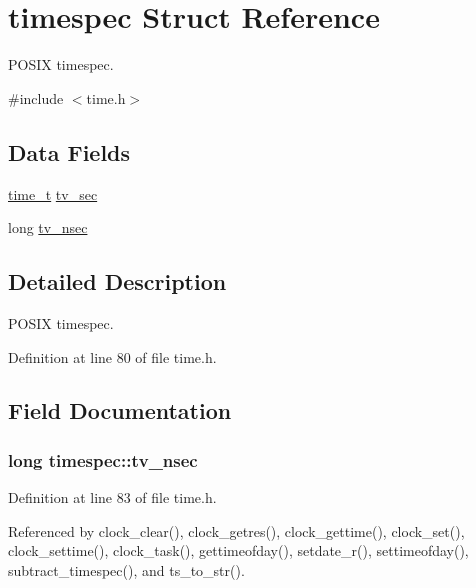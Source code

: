 \hypertarget{structtimespec}{\section{timespec Struct Reference}
\label{structtimespec}
}


P\-O\-S\-I\-X timespec.  




{\ttfamily \#include $<$time.\-h$>$}

\subsection*{Data Fields}
\begin{DoxyCompactItemize}
\item 
\hyperlink{time_8h_a3346b04b0420b32ccf6b706551b70762}{time\-\_\-t} \hyperlink{structtimespec_afc3302668d7cb5952f590da69fdd4955}{tv\-\_\-sec}
\item 
long \hyperlink{structtimespec_ae3c7510dafa8cbcaede866ed13c99683}{tv\-\_\-nsec}
\end{DoxyCompactItemize}


\subsection{Detailed Description}
P\-O\-S\-I\-X timespec. 

Definition at line 80 of file time.\-h.



\subsection{Field Documentation}
\hypertarget{structtimespec_ae3c7510dafa8cbcaede866ed13c99683}{
\subsubsection[{tv\-\_\-nsec}]{\setlength{\rightskip}{0pt plus 5cm}long timespec\-::tv\-\_\-nsec}}\label{structtimespec_ae3c7510dafa8cbcaede866ed13c99683}


Definition at line 83 of file time.\-h.



Referenced by clock\-\_\-clear(), clock\-\_\-getres(), clock\-\_\-gettime(), clock\-\_\-set(), clock\-\_\-settime(), clock\-\_\-task(), gettimeofday(), setdate\-\_\-r(), settimeofday(), subtract\-\_\-timespec(), and ts\-\_\-to\-\_\-str().

